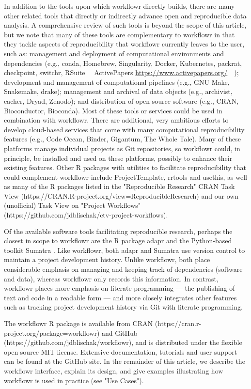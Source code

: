 \documentclass[9pt,a4paper]{extarticle}
\begin{document}
In addition to the tools upon which workflowr directly builds, there are
many other related tools that directly or indirectly advance open and
reproducible data analysis. A comprehensive review of such tools is
beyond the scope of this article, but we note that many of these tools
are complementary to workflowr in that they tackle aspects of
reproducibility that workflowr currently leaves to the user, such as:
management and deployment of computational environments and dependencies
(e.g., conda, Homebrew, Singularity, Docker, Kubernetes, packrat,
checkpoint, switchr, RSuite ~~ActivePapers
\url{https://www.activepapers.org/}~~); development and management of
computational pipelines (e.g., GNU Make, Snakemake, drake); management
and archival of data objects (e.g., archivist, cacher, Dryad, Zenodo);
and distribution of open source software (e.g., CRAN, Bioconductor,
Bioconda). Most of these tools or services could be used in combination
with workflowr. There are additional, very ambitious efforts to develop
cloud-based services that come with many computational reproducibility
features (e.g., Code Ocean, Binder, Gigantum, The Whole Tale). Many of
these platforms manage individual projects as Git repositories, so
workflowr could, in principle, be installed and used on these platforms,
possibly to enhance their existing features. Other R packages with
utilities to facilitate reproducibility that could complement workflowr
include ProjectTemplate, rrtools and usethis, as well as many of the R
packages listed in the "Reproducible Research" CRAN Task View
(https://CRAN.R-project.org/view=ReproducibleResearch) and our own
(unofficial) Task View on "Project Workflows"
(https://github.com/jdblischak/ctv-project-workflows).

Of the available software tools facilitating reproducible research,
perhaps the closest in scope to workflowr are the R package adapr
\cite{Gelfond2018} and the Python-based toolkit Sumatra
\cite{Davidson2014}. Like workflowr, both adapr and Sumatra use version
control to maintain a project development history. Unlike workflowr,
both place considerable emphasis on managing and keeping track of
dependencies (software and data), whereas workflowr only records this
information. In contrast, workflowr places more emphasis on literate
programming --- the publishing of text and code in a readable form ---
and more closely integrates other features such as tracking project
development history via Git with literate programming.

The workflowr R package is available from CRAN
(https://cran.r-project.org/package=workflowr) and GitHub
(https://github.com/jdblischak/workflowr), and is distributed under the
flexible open source MIT license. Extensive documentation, tutorials and
user support can be found at the GitHub site. In the remainder of this
article, we describe the workflowr interface, explain its design, and
give examples illustrating how workflowr is used in practice (see "Use
Cases").
\end{document}
